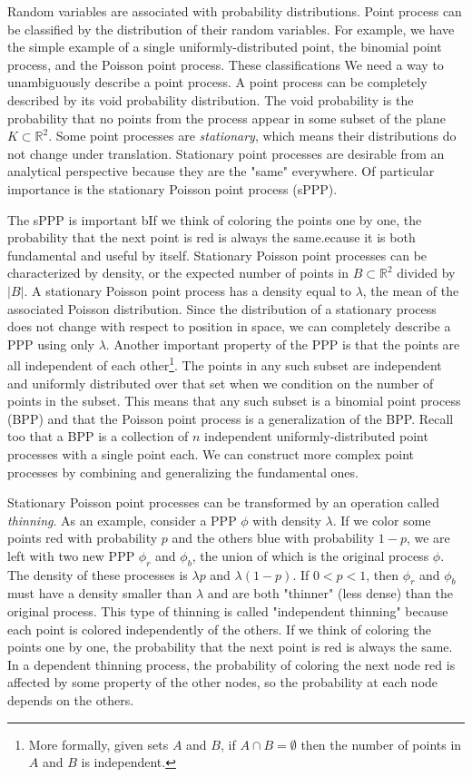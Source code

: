 \documentclass[]{article}
\begin{document}
Random variables are associated with probability distributions. Point process can be classified by the distribution of their random variables. For example, we have the simple example of a single uniformly-distributed point, the binomial point process, and the Poisson point process. These classifications We need a way to unambiguously describe a point process. A point process can be completely described by its void probability distribution. The void probability is the probability that no points from the process appear in some subset of the plane $K \subset \mathbb{R}^2$.
Some point processes are \textit{stationary}, which means their distributions do not change under translation.
Stationary point processes are desirable from an analytical perspective because they are the "same" everywhere. Of particular importance is the stationary Poisson point process (sPPP).

The sPPP is important bIf we think of coloring the points one by one, the probability that the next point is red is always the same.ecause it is both fundamental and useful by itself. Stationary Poisson point processes can be characterized by density, or the expected number of points in $B \subset \mathbb{R}^2$ divided by $|B|$. A stationary Poisson point process has a density equal to $\lambda$, the mean of the associated Poisson distribution. Since the distribution of a stationary process does not change with respect to position in space, we can completely describe a PPP using only $\lambda$. Another important property of the PPP is that the points are all independent of each other\footnote{More formally, given sets $A$ and $B$, if $A \cap B = \emptyset$ then the number of points in $A$ and $B$ is independent.}. The points in any such subset are independent and uniformly distributed over that set when we condition on the number of points in the subset. This means that any such subset is a binomial point process (BPP) and that the Poisson point process is a generalization of the BPP. Recall too that a BPP is a collection of $n$ independent uniformly-distributed point processes with a single point each. We can construct more complex point processes by combining and generalizing the fundamental ones.

Stationary Poisson point processes can be transformed by an operation called \textit{thinning}. As an example, consider a PPP $\phi$ with density $\lambda$. If we color some points red with probability $p$ and the others blue with probability $1-p$, we are left with two new PPP $\phi_r$ and $\phi_b$, the union of which is the original process $\phi$. The density of these processes is $\lambda p$ and $\lambda (1-p)$.
If $0 < p < 1$, then $\phi_r$ and $\phi_b$ must have a density smaller than $\lambda$ and are both "thinner" (less dense) than the original process. This type of thinning is called "independent thinning" because each point is colored independently of the others. If we think of coloring the points one by one, the probability that the next point is red is always the same. In a dependent thinning process, the probability of coloring the next node red is affected by some property of the other nodes, so the probability at each node depends on the others.
\end{document}
